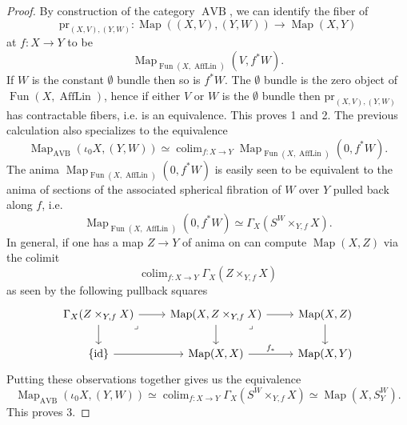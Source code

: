 \documentclass{article}
\newcommand{\pr}{\mathrm{pr}}
\newcommand{\id}{\mathrm{id}}
\DeclareMathOperator{\AVB}{AVB}
\DeclareMathOperator{\Fun}{Fun}
\DeclareMathOperator{\AffLin}{AffLin}
\DeclareMathOperator{\Map}{Map}
\DeclareMathOperator*{\colim}{colim}
\begin{document}
\begin{proof}
    By construction of the category $\AVB$, we can identify the fiber of 
    \[
      \pr_{(X,V),(Y,W)} \colon \Map((X,V), (Y,W)) \to \Map(X,Y)
    \]
    at $f \colon X \to Y$ to be 
    \[
      \Map_{\Fun(X,\AffLin)}(V, f^* W).  
    \]
    If $W$ is the constant $\emptyset$ bundle then so is $f^* W$.
    The $\emptyset$ bundle is the zero object of $\Fun(X,\AffLin)$, hence if either 
    $V$ or $W$ is the $\emptyset$ bundle then $\pr_{(X,V),(Y,W)}$ has contractable fibers, i.e. is an equivalence.
    This proves 1 and 2. 
    The previous calculation also specializes to the equivalence 
    \[
    \Map_{\AVB}(\iota_0 X, (Y,W)) \simeq \colim_{f \colon X \to Y} \Map_{\Fun(X,\AffLin)}(0,f^* W).    
    \]
    The anima $\Map_{\Fun(X,\AffLin)}(0,f^* W)$ is easily seen to be equivalent to the anima of sections of 
    the associated spherical fibration of $W$ over $Y$ pulled back along $f$, i.e. 
    \[
    \Map_{\Fun(X,\AffLin)}(0,f^* W) \simeq \Gamma_X( S^W \times_{Y, f} X).
    \]
    In general, if one has a map $Z \to Y$ of anima on can compute 
    $\Map(X,Z)$ via the colimit
    \[
      \colim_{f \colon X \to Y} \Gamma_X( Z \times_{Y, f} X)  
    \]
    as seen by the following pullback squares 
    \[\begin{tikzcd}
        {\Gamma_X(Z \times_{Y,f}X)} & {\Map(X,Z\times_{Y,f}X)} & {\Map(X,Z)} \\
        {\{\id\}} & {\Map(X,X)} & {\Map(X,Y)}
        \arrow[from=1-1, to=2-1]
        \arrow[from=1-1, to=1-2]
        \arrow[from=1-2, to=2-2]
        \arrow[from=2-1, to=2-2]
        \arrow[from=1-2, to=1-3]
        \arrow[from=1-3, to=2-3]
        \arrow["{f_*}", from=2-2, to=2-3]
        \arrow["\lrcorner"{anchor=center, pos=0.125}, draw=none, from=1-2, to=2-3]
        \arrow["\lrcorner"{anchor=center, pos=0.125}, draw=none, from=1-1, to=2-2]
    \end{tikzcd}\]
    Putting these observations together gives us the equivalence 
    \[
        \Map_{\AVB}(\iota_0 X, (Y,W)) \simeq  \colim_{f \colon X \to Y} \Gamma_X( S^W \times_{Y, f} X)  \simeq \Map(X,S^W_Y).
    \]
    This proves 3.
\end{proof}
\end{document}
